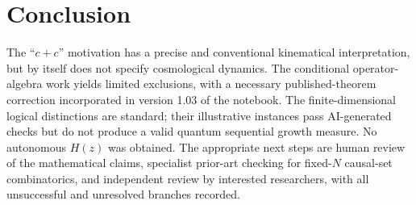 \documentclass[11pt,a4paper]{article}
\begin{document}
\section{Conclusion}
The ``$c+c$'' motivation has a precise and conventional kinematical interpretation, but by itself does not specify cosmological dynamics. The conditional operator-algebra work yields limited exclusions, with a necessary published-theorem correction incorporated in version 1.03 of the notebook. The finite-dimensional logical distinctions are standard; their illustrative instances pass AI-generated checks but do not produce a valid quantum sequential growth measure. No autonomous $H(z)$ was obtained. The appropriate next steps are human review of the mathematical claims, specialist prior-art checking for fixed-$N$ causal-set combinatorics, and independent review by interested researchers, with all unsuccessful and unresolved branches recorded.
\end{document}
